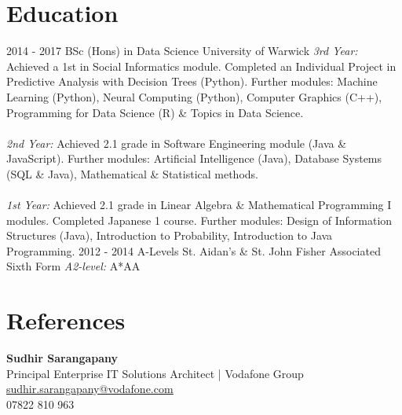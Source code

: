 \documentclass[]{friggeri-cv}
\begin{document}
\section{Education}
\begin{entrylist}
  \entry %
    {2014 - 2017}
    {BSc (Hons) in Data Science}
    {University of Warwick}
    {\emph{3rd Year:} Achieved a 1st in Social Informatics module. Completed an Individual Project in Predictive Analysis with Decision Trees (Python). Further modules: Machine Learning (Python), Neural Computing (Python), Computer Graphics (C++), Programming for Data Science (R) \& Topics in Data Science.\\\\
    \emph{2nd Year:} Achieved 2.1 grade in Software Engineering module (Java \& JavaScript). Further modules: Artificial Intelligence (Java), Database Systems (SQL \& Java), Mathematical \& Statistical methods.\\\\
    \emph{1st Year:} Achieved 2.1 grade in Linear Algebra \& Mathematical Programming I modules. Completed Japanese 1 course. Further modules: Design of Information Structures (Java), Introduction to Probability, Introduction to Java Programming.}
  \entry %
    {2012 - 2014}
    {A-Levels}
    {St. Aidan's \& St. John Fisher Associated Sixth Form}
    {\emph{A2-level:} A*AA}
\end{entrylist}

\section{References}
\textbf{Sudhir Sarangapany}\\
Principal Enterprise IT Solutions Architect | Vodafone Group\\
\href{mailto:sudhir.sarangapany@vodafone.com}{\underline{sudhir.sarangapany@vodafone.com}}\\
07822 810 963
\end{document}
